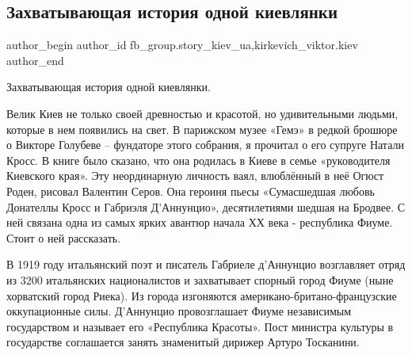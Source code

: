  
 
 
 
 
 
\subsection{Захватывающая история одной киевлянки}
\label{sec:04_01_2022.fb.fb_group.story_kiev_ua.1.istoria_odnoj_kievljanki}
 
\ifcmt
 author_begin
   author_id fb_group.story_kiev_ua,kirkevich_viktor.kiev
 author_end
\fi

Захватывающая история одной киевлянки.

Велик Киев не только своей древностью и красотой, но удивительными людьми,
которые в нем появились на свет. В парижском музее «Гемэ» в редкой брошюре о
Викторе Голубеве – фундаторе этого собрания, я прочитал о его супруге Натали
Кросс. В книге было сказано, что она родилась в Киеве в семье «руководителя
Киевского края». Эту неординарную личность ваял, влюблённый в неё Огюст Роден,
рисовал Валентин Серов. Она героиня пьесы «Сумасшедшая любовь Донателлы Кросс и
Габриэля Д'Аннунцио», десятилетиями шедшая на Бродвее. С ней связана одна из
самых ярких авантюр начала ХХ века - республика Фиуме. Стоит о ней рассказать.


В 1919 году итальянский поэт и писатель Габриеле д’Аннунцио возглавляет отряд
из 3200 итальянских националистов и захватывает спорный город Фиуме (ныне
хорватский город Риека). Из города изгоняются американо-британо-французские
оккупационные силы. Д’Аннунцио провозглашает Фиуме независимым государством и
называет его «Республика Красоты». Пост министра культуры в государстве
соглашается занять знаменитый дирижер Артуро Тосканини.


